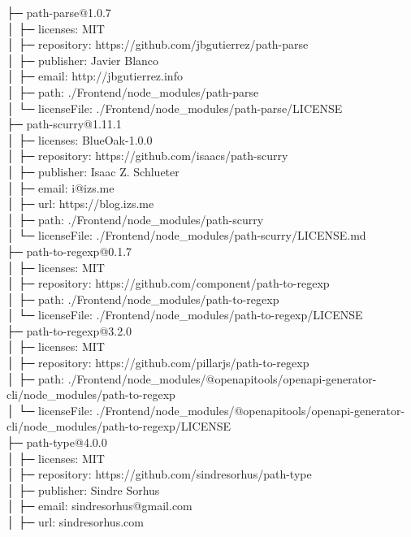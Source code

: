 ├─ path-parse@1.0.7\\
│  ├─ licenses: MIT\\
│  ├─ repository: https://github.com/jbgutierrez/path-parse\\
│  ├─ publisher: Javier Blanco\\
│  ├─ email: http://jbgutierrez.info\\
│  ├─ path: ./Frontend/node\_modules/path-parse\\
│  └─ licenseFile: ./Frontend/node\_modules/path-parse/LICENSE\\
├─ path-scurry@1.11.1\\
│  ├─ licenses: BlueOak-1.0.0\\
│  ├─ repository: https://github.com/isaacs/path-scurry\\
│  ├─ publisher: Isaac Z. Schlueter\\
│  ├─ email: i@izs.me\\
│  ├─ url: https://blog.izs.me\\
│  ├─ path: ./Frontend/node\_modules/path-scurry\\
│  └─ licenseFile: ./Frontend/node\_modules/path-scurry/LICENSE.md\\
├─ path-to-regexp@0.1.7\\
│  ├─ licenses: MIT\\
│  ├─ repository: https://github.com/component/path-to-regexp\\
│  ├─ path: ./Frontend/node\_modules/path-to-regexp\\
│  └─ licenseFile: ./Frontend/node\_modules/path-to-regexp/LICENSE\\
├─ path-to-regexp@3.2.0\\
│  ├─ licenses: MIT\\
│  ├─ repository: https://github.com/pillarjs/path-to-regexp\\
│  ├─ path: ./Frontend/node\_modules/@openapitools/openapi-generator-cli/node\_modules/path-to-regexp\\
│  └─ licenseFile: ./Frontend/node\_modules/@openapitools/openapi-generator-cli/node\_modules/path-to-regexp/LICENSE\\
├─ path-type@4.0.0\\
│  ├─ licenses: MIT\\
│  ├─ repository: https://github.com/sindresorhus/path-type\\
│  ├─ publisher: Sindre Sorhus\\
│  ├─ email: sindresorhus@gmail.com\\
│  ├─ url: sindresorhus.com\\
